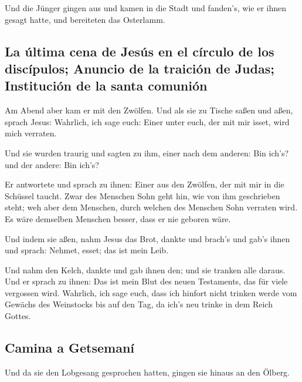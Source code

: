  Und die Jünger gingen aus und kamen in die Stadt und
fanden's, wie er ihnen gesagt hatte, und bereiteten das Osterlamm.

\hypertarget{la-uxfaltima-cena-de-jesuxfas-en-el-cuxedrculo-de-los-discuxedpulos-anuncio-de-la-traiciuxf3n-de-judas-instituciuxf3n-de-la-santa-comuniuxf3n}{%
\subsection{La última cena de Jesús en el círculo de los discípulos;
Anuncio de la traición de Judas; Institución de la santa
comunión}\label{la-uxfaltima-cena-de-jesuxfas-en-el-cuxedrculo-de-los-discuxedpulos-anuncio-de-la-traiciuxf3n-de-judas-instituciuxf3n-de-la-santa-comuniuxf3n}}

 Am Abend aber kam er mit den Zwölfen. 
Und als sie zu Tische saßen und aßen, sprach Jesus: Wahrlich, ich sage
euch: Einer unter euch, der mit mir isset, wird mich verraten.

 Und sie wurden traurig und sagten zu ihm, einer nach dem
anderen: Bin ich's? und der andere: Bin ich's?

 Er antwortete und sprach zu ihnen: Einer aus den
Zwölfen, der mit mir in die Schüssel taucht.  Zwar des
Menschen Sohn geht hin, wie von ihm geschrieben steht; weh aber dem
Menschen, durch welchen des Menschen Sohn verraten wird. Es wäre
demselben Menschen besser, dass er nie geboren wäre.

 Und indem sie aßen, nahm Jesus das Brot, dankte und
brach's und gab's ihnen und sprach: Nehmet, esset; das ist mein Leib.

 Und nahm den Kelch, dankte und gab ihnen den; und sie
tranken alle daraus.  Und er sprach zu ihnen: Das ist
mein Blut des neuen Testaments, das für viele vergossen wird.
 Wahrlich, ich sage euch, dass ich hinfort nicht trinken
werde vom Gewächs des Weinstocks bis auf den Tag, da ich's neu trinke in
dem Reich Gottes.

\hypertarget{camina-a-getsemanuxed}{%
\subsection{Camina a Getsemaní}\label{camina-a-getsemanuxed}}

 Und da sie den Lobgesang gesprochen hatten, gingen sie
hinaus an den Ölberg.

